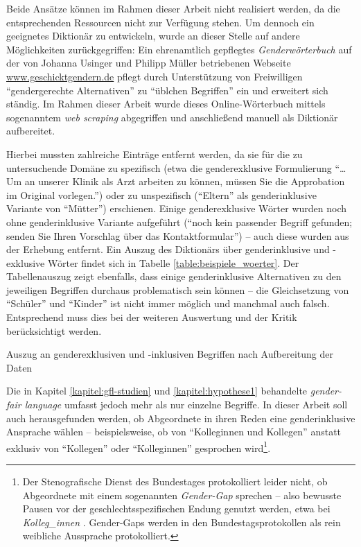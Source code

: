 \documentclass[12pt, 
    twoside=false, 
    bibliography=totoc, 
    numbers=endperiod, 
    headings=normal, 
    toc=chapterentrydotfill
    ]{scrbook}
\begin{document}
Beide Ansätze können im Rahmen dieser Arbeit nicht realisiert werden, da die entsprechenden Ressourcen nicht zur Verfügung stehen. Um dennoch ein geeignetes Diktionär zu entwickeln, wurde an dieser Stelle auf andere Möglichkeiten zurückgegriffen:
Ein ehrenamtlich gepflegtes \emph{Genderwörterbuch} auf der von Johanna Usinger und Philipp Müller betriebenen Webseite \url{www.geschicktgendern.de} pflegt durch Unterstützung von Freiwilligen \enquote{gendergerechte Alternativen} zu \enquote{üblchen Begriffen} ein und erweitert sich ständig. Im Rahmen dieser Arbeit wurde dieses Online-Wörterbuch mittels sogenanntem \emph{web scraping} \parencite{wickham_2016} abgegriffen und anschließend manuell als Diktionär aufbereitet. 

Hierbei mussten zahlreiche Einträge entfernt werden, da sie für die zu untersuchende Domäne zu spezifisch (etwa die genderexklusive Formulierung \enquote{… Um an unserer Klinik als Arzt arbeiten zu können, müssen Sie die Approbation im Original vorlegen.}) oder zu unspezifisch (\enquote{Eltern} als genderinklusive Variante von \enquote{Mütter}) erschienen. Einige genderexklusive Wörter wurden noch ohne genderinklusive Variante aufgeführt (\enquote{noch kein passender Begriff gefunden; senden Sie Ihren Vorschlag über das Kontaktformular}) -- auch diese wurden aus der Erhebung entfernt. Ein Auszug des Diktionärs über genderinklusive und -exklusive Wörter findet sich in Tabelle \ref{table:beispiele_woerter}. Der Tabellenauszug zeigt ebenfalls, dass einige genderinklusive Alternativen zu den jeweiligen Begriffen durchaus problematisch sein können -- die Gleichsetzung von \enquote{Schüler} und \enquote{Kinder} ist nicht immer möglich und manchmal auch falsch. Entsprechend muss dies bei der weiteren Auswertung und der Kritik berücksichtigt werden.


\begin{table}[htb]
    \centering
    \caption[Auszug an genderexklusiven und -inklusiven Begriffen nach Aufbereitung der Daten]{Auszug an genderexklusiven und -inklusiven Begriffen nach Aufbereitung der Daten}
    
    \label{table:beispiele_woerter}
\end{table}

Die in Kapitel \ref{kapitel:gfl-studien} und \ref{kapitel:hypothese1} behandelte \emph{gender-fair language} umfasst jedoch mehr als nur einzelne Begriffe. In dieser Arbeit soll auch herausgefunden werden, ob Abgeordnete in ihren Reden eine genderinklusive Ansprache wählen -- beispielsweise, ob von \enquote{Kolleginnen und Kollegen} anstatt exklusiv von \enquote{Kollegen} oder \enquote{Kolleginnen} gesprochen wird\footnote{Der Stenografische Dienst des Bundestages protokolliert leider nicht, ob Abgeordnete mit einem sogenannten \emph{Gender-Gap} sprechen -- also bewusste Pausen vor der geschlechtsspezifischen Endung genutzt werden, etwa bei \emph{Kolleg\_innen} \parencite[vgl.][]{reisigl_2017}. Gender-Gaps werden in den Bundestagsprotokollen als rein weibliche Aussprache protokolliert.}. 
\end{document}
